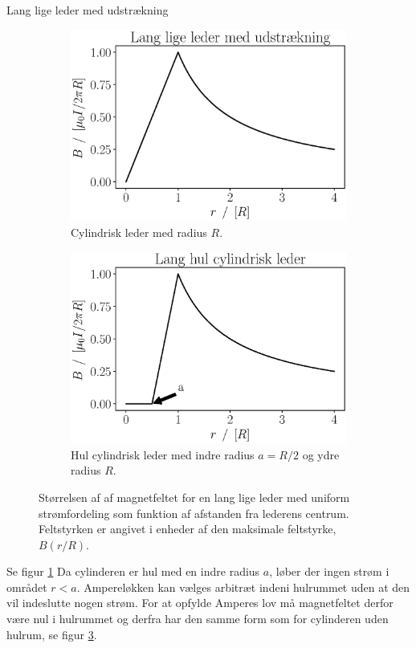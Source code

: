 \begin{opgave}{Lang lige leder med udstrækning}
\begin{figure}
\begin{subfigure}[t]{.47\textwidth}
            \includegraphics[width=\columnwidth]{facit/figurer/elektro/lange_lige_leder_cylinder.eps}
            \caption{Cylindrisk leder med radius $R$.}
            \label{fig:lang_lige_cylindrisk_leder}
        \end{subfigure}
        \hfill
        \begin{subfigure}[t]{.47\textwidth}
            \centering
            \includegraphics[width=\columnwidth]{facit/figurer/elektro/lange_lige_leder_hul_cylinder.eps}
            \caption{Hul cylindrisk leder med indre radius $a = R/2$ og ydre radius $R$.}
            \label{fig:lang_lige_hul_cylindrisk_leder}
        \end{subfigure}
        \caption{Størrelsen af af magnetfeltet for en lang lige leder med uniform strømfordeling som funktion af afstanden fra lederens centrum. Feltstyrken er angivet i enheder af den maksimale feltstyrke, $B(r/R)$.}
    \end{figure}
    \opg Se figur \ref{fig:lang_lige_cylindrisk_leder}
    \opg Da cylinderen er hul med en indre radius $a$, løber der ingen strøm i området $r<a$. Ampereløkken kan vælges arbitræt indeni hulrummet uden at den vil indeslutte nogen strøm. For at opfylde Amperes lov må magnetfeltet derfor være nul i hulrummet og derfra har den samme form som for cylinderen uden hulrum, se figur \ref{fig:lang_lige_hul_cylindrisk_leder}.
\end{opgave}

